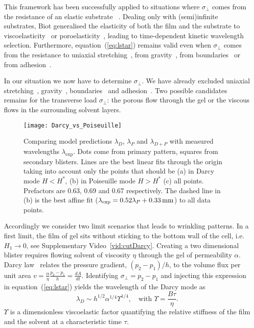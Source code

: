 \documentclass[twocolumn,superscriptaddress,showpacs,preprintnumbers,
amsmath,amssymb,prl]{revtex4-1}
\begin{document}

This framework has been successfully applied to situations where $\sigma_{\perp}$ comes from the resistance of an elastic substrate ~\cite{Gough1940, Bijlaard1946}. Dealing only with (semi)infinite substrates, Biot generalised the elasticity of both the film and the substrate to viscoelasticity~\cite{Biot1957} or poroelasticity~\cite{Biot1964}, leading to time-dependent kinetic wavelength selection. Furthermore, equation~(\ref{eq:lstar}) remains valid even when $\sigma_{\perp}$ comes from the resistance to uniaxial stretching~\cite{Cerda2003}, from gravity~\cite{Smoluchowski1910, Kolinski2009, Vella2009, Pineirua2013, Lucantonio2013}, from boundaries~\cite{Vandeparre2011a, Li2013} or from adhesion~\cite{Vella2009a}.

In our situation we now have to determine $\sigma_\perp$. We have already excluded uniaxial stretching~\cite{Cerda2003}, gravity~\cite{Smoluchowski1910, Kolinski2009, Vella2009, Pineirua2013, Lucantonio2013}, boundaries~\cite{Vandeparre2011a, Li2013} and adhesion~\cite{Vella2009a}. Two possible candidates remains for the transverse load $\sigma_\perp$: the porous flow through the gel or the viscous flows in the surrounding solvent layers.


\begin{figure*}
	\texttt{[image: Darcy\_vs\_Poiseuille]}
	\caption{Comparing model predictions $\lambda_D$, $\lambda_P$ and $\lambda_{D+P}$ with measured wavelengths $\lambda_\text{exp}$. Dots come from primary pattern, squares from secondary blisters. Lines are the best linear fits through the origin taking into account only the points that should be (a) in Darcy mode $H<H^*$, (b) in Poiseuille mode $H>H^*$ (c) all points. Prefactors are 0.63, 0.69 and 0.67 respectively. The dashed line in (b) is the best affine fit ($\lambda_{\rm exp}=0.52\lambda_{P}+\SI{0.33}{\milli\metre}$) to all data points.}
	\label{fig:DarcyPoiseuille}
\end{figure*}

Accordingly we consider two limit scenarios that leads to wrinkling patterns. In a first limit, the film of gel sits without sticking to the bottom wall of the cell, i.e. $H_1\rightarrow0$, see Supplementary Video~\ref{vid:cutDarcy}. Creating a two dimensional blister requires flowing solvent of viscosity $\eta$ through the gel of permeability $\alpha$. Darcy law~\cite{Darcy1856} relates the pressure gradient, $(p_2-p_1)/h$, to the volume flux per unit area $v = \frac{\alpha}{\eta}\frac{p_2-p_1}{h} = \frac{dA}{dt}$. Identifying $\sigma_{\perp}=p_2-p_1$ and injecting this expression in equation~(\ref{eq:lstar}) yields the wavelength of the Darcy mode as
\begin{equation}
\lambda_D \sim h^{1/2} \alpha^{1/4} \Upsilon^{1/4},\quad\text{with } \Upsilon = \frac{B\tau}{\eta}.
\end{equation}
$\Upsilon$ is a dimensionless viscoelastic factor quantifying the relative stiffness of the film and the solvent at a characteristic time $\tau$. 
\end{document}
